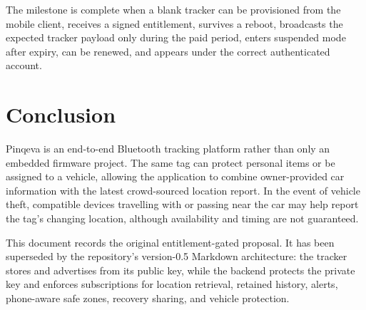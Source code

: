 \documentclass[12pt,a4paper]{article}
\begin{document}
The milestone is complete when a blank tracker can be provisioned from the
mobile client, receives a signed entitlement, survives a reboot, broadcasts the
expected tracker payload only during the paid period, enters suspended mode
after expiry, can be renewed, and appears under the correct authenticated
account.

\section{Conclusion}

Pinqeva is an end-to-end Bluetooth tracking platform rather than only an
embedded firmware project. The same tag can protect personal items or be
assigned to a vehicle, allowing the application to combine owner-provided car
information with the latest crowd-sourced location report. In the event of
vehicle theft, compatible devices travelling with or passing near the car may
help report the tag's changing location, although availability and timing are
not guaranteed.

This document records the original entitlement-gated proposal. It has been
superseded by the repository's version-0.5 Markdown architecture: the tracker
stores and advertises from its public key, while the backend protects the
private key and enforces subscriptions for location retrieval, retained
history, alerts, phone-aware safe zones, recovery sharing, and vehicle
protection.
\end{document}
